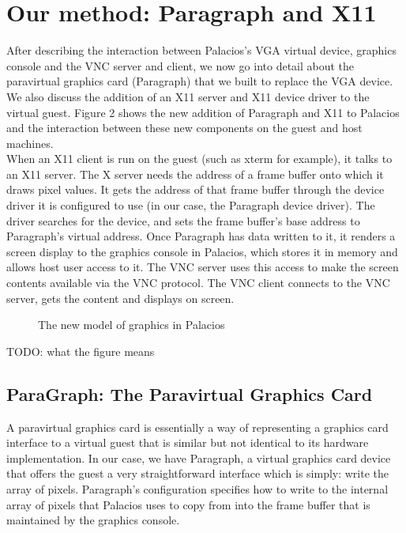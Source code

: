 \documentclass{acm_proc_article-sp}
\begin{document}
\section{Our method: Paragraph and X11}
After describing the interaction between Palacios's VGA virtual device, graphics console and the VNC server and client, we now go into detail
about the paravirtual graphics card (Paragraph) that we built to replace the VGA 
device. We also discuss the addition of an X11 server and X11 device driver to
the virtual guest. Figure 2 shows the new addition of Paragraph and X11 to
Palacios and the interaction between these new components on the guest and host
machines. \\
When an X11 client is run on the guest (such as xterm for example), it talks to
an X11 server. The X server needs the address of a frame buffer onto which it
draws pixel values. It gets the address of that frame buffer through the device
driver it is configured to use (in our case, the Paragraph device driver). The 
driver searches for the device, and sets the frame buffer's base address to
Paragraph's virtual address. Once Paragraph has data written to it, it renders a
screen display to the graphics console in Palacios, which stores it in memory
and allows host user access to it. The VNC server uses this access to make the 
screen contents available via the VNC protocol. The VNC client connects to the 
VNC server, gets the content and displays on screen.
\begin{figure}[h]                                              
\centering                                                     
{}                   
\caption{The new model of graphics in Palacios}   
\end{figure}                                                   
 TODO: what the figure means
\subsection{ParaGraph: The Paravirtual Graphics Card}
A paravirtual graphics card is essentially a way of representing a graphics card
interface to a virtual guest that is similar but not identical to its hardware
implementation. In our case, we have Paragraph, a virtual graphics card device
that offers the guest a very straightforward interface which is simply: write
the array of pixels. Paragraph's configuration specifies how to write to the
internal array of pixels that Palacios uses to copy from into the frame buffer
that is maintained by the graphics console. \\
\end{document}
